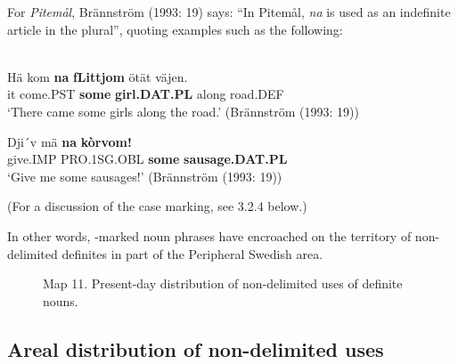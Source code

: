 For \textit{Pitemål}, Brännström (1993: 19) says: “In Pitemål, \textit{na} is used as an indefinite article in the plural”, quoting examples such as the following:


\ea\label{}
\\
\gll Hä  kom  \textbf{na} \textbf{  fLi{\textasciigrave}ttjom} ötät  väjen.\\
it  come.PST  \textbf{some} \textbf{girl.DAT.PL} along  road.DEF\\
\glt ‘There came some girls along the road.’ (Brännström (1993: 19))

\z

\ea
\gll Dji´v  mä  \textbf{na} \textbf{  kòrvom!}\\
give.IMP  PRO.1SG.OBL  \textbf{some} \textbf{sausage.DAT.PL}\\
\glt ‘Give me some sausages!’ (Brännström (1993: 19))

\z

(For a discussion of the case marking, see 3.2.4 below.) 


In other words, -marked noun phrases have encroached on the territory of non-delimited definites in part of the Peripheral Swedish area. 


\begin{figure}[h]

\begin{minipage}{5.30556in}

Map 11. Present-day distribution of non-delimited uses of definite nouns.


\end{minipage}

\end{figure}

\subsection{ Areal distribution of non-delimited uses}

